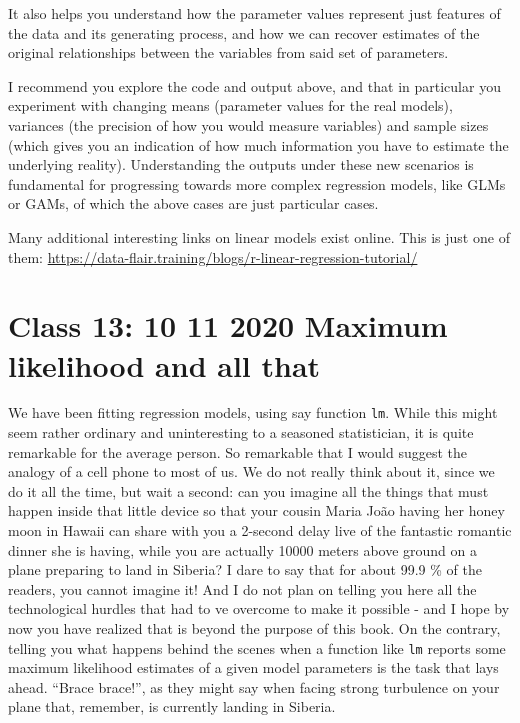 \documentclass[
]{book}
\begin{document}
It also helps you understand how the parameter values represent just features of the data and its generating process, and how we can recover estimates of the original relationships between the variables from said set of parameters.

I recommend you explore the code and output above, and that in particular you experiment with changing means (parameter values for the real models), variances (the precision of how you would measure variables) and sample sizes (which gives you an indication of how much information you have to estimate the underlying reality). Understanding the outputs under these new scenarios is fundamental for progressing towards more complex regression models, like GLMs or GAMs, of which the above cases are just particular cases.

Many additional interesting links on linear models exist online. This is just one of them: \url{https://data-flair.training/blogs/r-linear-regression-tutorial/}

\hypertarget{aula12}{%
\chapter{Class 13: 10 11 2020 Maximum likelihood and all that}\label{aula12}}

We have been fitting regression models, using say function \texttt{lm}. While this might seem rather ordinary and uninteresting to a seasoned statistician, it is quite remarkable for the average person. So remarkable that I would suggest the analogy of a cell phone to most of us. We do not really think about it, since we do it all the time, but wait a second: can you imagine all the things that must happen inside that little device so that your cousin Maria João having her honey moon in Hawaii can share with you a 2-second delay live of the fantastic romantic dinner she is having, while you are actually 10000 meters above ground on a plane preparing to land in Siberia? I dare to say that for about 99.9 \% of the readers, you cannot imagine it! And I do not plan on telling you here all the technological hurdles that had to ve overcome to make it possible - and I hope by now you have realized that is beyond the purpose of this book. On the contrary, telling you what happens behind the scenes when a function like \texttt{lm} reports some maximum likelihood estimates of a given model parameters is the task that lays ahead. ``Brace brace!'', as they might say when facing strong turbulence on your plane that, remember, is currently landing in Siberia.
\end{document}

